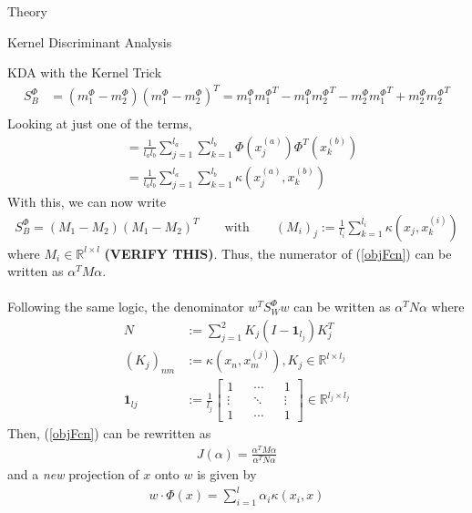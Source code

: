 \begin{section}{Theory}
\begin{subsection}{Kernel Discriminant Analysis}
\begin{subsubsection}{KDA with the Kernel Trick}
\begin{align*}
	S_B^{\Phi} &= \left( m_1^{\Phi} - m_2^{\Phi} \right) \left( m_1^{\Phi} - m_2^{\Phi} \right)^T 
	= m_1^{\Phi} {m_1^{\Phi}}^T - m_1^{\Phi} {m_2^{\Phi}}^T - m_2^{\Phi} {m_1^{\Phi}}^T + m_2^{\Phi} {m_2^{\Phi}}^T \\
\end{align*}
Looking at just one of the terms, 
\begin{align*}
	&= \frac{1}{l_a l_b} \sum_{j=1}^{l_a} \sum_{k=1}^{l_b} \Phi \left( x_j^{(a)} \right) \Phi^T \left( x_k^{(b)} \right) \\
	&= \frac{1}{l_a l_b} \sum_{j=1}^{l_a} \sum_{k=1}^{l_b} \kappa \left( x_j^{(a)}, x_k^{(b)} \right )
\end{align*}
With this, we can now write 
\begin{align*}
	S_B^{\Phi} = \left( M_1 - M_2 \right) \left( M_1 - M_2 \right)^T 
	\qquad \text{with} \qquad
		\left( M_i \right)_j := \frac{1}{l_i} \sum_{k=1}^{l_i} \kappa \left( x_j, x_k^{(i)} \right)
\end{align*}
where $M_i \in \mathbb{R}^{ l \times l }$ \textbf{(VERIFY THIS)}. Thus, the numerator of (\ref{objFcn}) can be written as $\alpha^T M \alpha$.
\\
\\
Following the same logic, the denominator $w^T S_W^{\Phi} w$ can be written as $\alpha^T N \alpha$ where
\begin{align*}
	N &:= \sum_{j=1}^2 K_j (I - \bm{1}_{l_j}) K_j^T \\
	\left( K_j \right)_{nm} &:= \kappa \left( x_n, x_m^{(j)} \right), K_j \in \mathbb{R}^{l \times l_j}\\
	\bm{1}_{lj} &:= \frac{1}{l_j} \begin{bmatrix} 1 && \cdots && 1 \\ \vdots && \ddots && \vdots \\ 1&& \cdots && 1 \end{bmatrix} \in \mathbb{R}^{l_j \times l_j}
\end{align*}
Then, (\ref{objFcn}) can be rewritten as
\begin{align}
	J(\alpha) = \frac{\alpha^T M \alpha }{\alpha^T N \alpha} \label{objFcn2}
\end{align}
and a \textit{new} projection of $x$ onto $w$ is given by
\begin{align}
	w \cdot \Phi(x)  = \sum_{i=1}^l \alpha_i \kappa(x_i,x)
\end{align}

\end{subsubsection}


\end{subsection}
\end{section}
